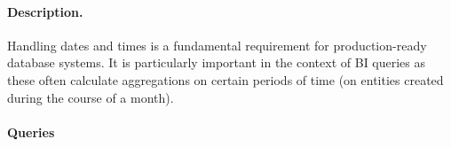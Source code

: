 
\paragraph{Description.}

Handling dates and times is a fundamental requirement for production-ready
database systems. It is particularly important in the context of BI queries as
these often calculate aggregations on certain periods of time (\eg on entities created during the course of a month).


\paragraph{Queries}
{\raggedright

}